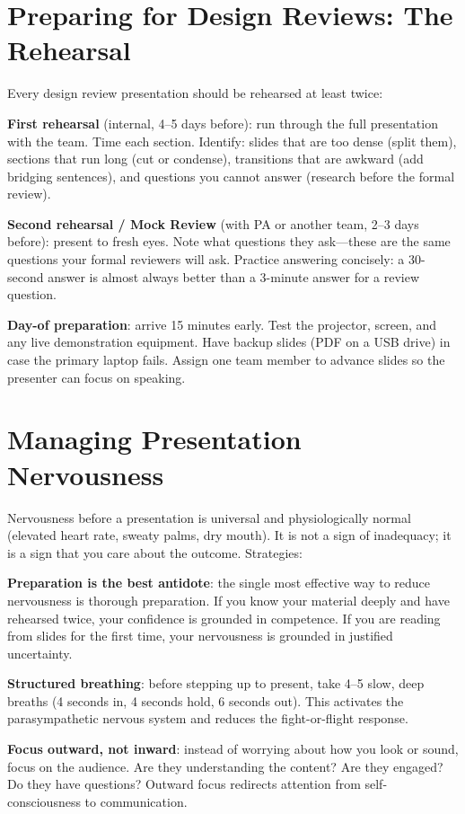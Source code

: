 \section{Preparing for Design Reviews: The Rehearsal}
Every design review presentation should be rehearsed at least twice:

\textbf{First rehearsal} (internal, 4--5 days before): run through the full presentation with the team. Time each section. Identify: slides that are too dense (split them), sections that run long (cut or condense), transitions that are awkward (add bridging sentences), and questions you cannot answer (research before the formal review).

\textbf{Second rehearsal / Mock Review} (with PA or another team, 2--3 days before): present to fresh eyes. Note what questions they ask---these are the same questions your formal reviewers will ask. Practice answering concisely: a 30-second answer is almost always better than a 3-minute answer for a review question.

\textbf{Day-of preparation}: arrive 15 minutes early. Test the projector, screen, and any live demonstration equipment. Have backup slides (PDF on a USB drive) in case the primary laptop fails. Assign one team member to advance slides so the presenter can focus on speaking.

\section{Managing Presentation Nervousness}
Nervousness before a presentation is universal and physiologically normal (elevated heart rate, sweaty palms, dry mouth). It is not a sign of inadequacy; it is a sign that you care about the outcome. Strategies:

\textbf{Preparation is the best antidote}: the single most effective way to reduce nervousness is thorough preparation. If you know your material deeply and have rehearsed twice, your confidence is grounded in competence. If you are reading from slides for the first time, your nervousness is grounded in justified uncertainty.

\textbf{Structured breathing}: before stepping up to present, take 4--5 slow, deep breaths (4 seconds in, 4 seconds hold, 6 seconds out). This activates the parasympathetic nervous system and reduces the fight-or-flight response.

\textbf{Focus outward, not inward}: instead of worrying about how you look or sound, focus on the audience. Are they understanding the content? Are they engaged? Do they have questions? Outward focus redirects attention from self-consciousness to communication.

